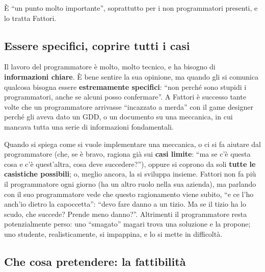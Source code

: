 È ``un punto molto importante'', soprattutto per i non programmatori presenti,
e lo tratta Fattori.

\subsection{Essere specifici, coprire tutti i casi}

Il lavoro del programmatore è molto, molto tecnico, e ha bisogno di
\textbf{informazioni chiare}. È bene sentire la sua opinione, ma quando gli si
comunica qualcosa bisogna essere \textbf{estremamente specifici}: ``non perché
sono stupidi i programmatori, anche se alcuni posso confermare''. A Fattori è
successo tante volte che un programmatore arrivasse ``incazzato a merda'' con
il game designer perché gli aveva dato un GDD, o un documento su una
meccanica, in cui mancava tutta una serie di informazioni fondamentali.

Quando si spiega come si vuole implementare una meccanica, o ci si fa aiutare
dal programmatore (che, se è bravo, ragiona già sui \textbf{casi limite}: ``ma
se c'è questa cosa e c'è quest'altra, cosa deve succedere?''), oppure si
coprono da soli \textbf{tutte le casistiche possibili}; o, meglio ancora, la si
sviluppa insieme. Fattori non fa più il programmatore ogni giorno (ha un altro
ruolo nella sua azienda), ma parlando con il suo programmatore vede che questo
ragionamento viene subito, ``e ce l'ho anch'io dietro la capoccetta'': ``devo
fare danno a un tizio. Ma se il tizio ha lo scudo, che succede? Prende meno
danno?''. Altrimenti il programmatore resta potenzialmente perso: uno
``smagato'' magari trova una soluzione e la propone; uno studente,
realisticamente, si impappina, e lo si mette in difficoltà.

\subsection{Che cosa pretendere: la fattibilità}

